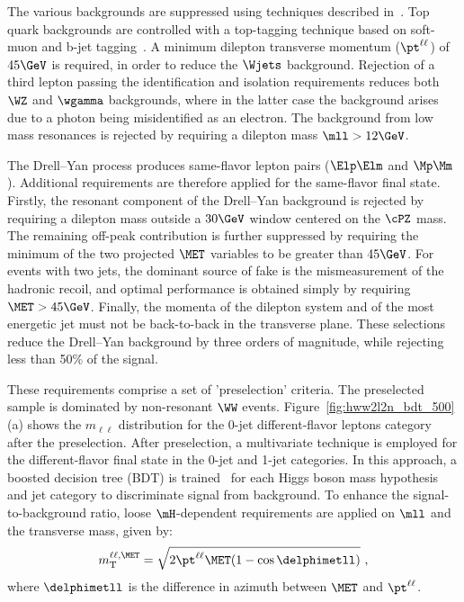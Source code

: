 The various backgrounds are suppressed using techniques described in~\cite{CMSobservation125}. Top quark backgrounds are controlled with a top-tagging technique based on soft-muon and b-jet tagging~\cite{CMS-PAS-BTV-11-003}. A minimum dilepton transverse momentum ($\pt^{\ell\ell}$) of $45\GeV$ is required, in order to reduce the $\Wjets$ background. Rejection of a third lepton passing the identification and isolation requirements reduces both $\WZ$ and $\wgamma$ backgrounds,
where in the latter case the background arises due to a photon being misidentified as an electron. The background from low mass resonances is rejected by requiring a dilepton mass $\mll>12\GeV$.

The Drell--Yan process produces same-flavor lepton pairs ($\Elp\Elm$ and $\Mp\Mm$). Additional requirements are 
therefore applied for the same-flavor final state. Firstly, the resonant component of the Drell--Yan background
is rejected by requiring a dilepton mass outside a $30\GeV$ window centered on the $\cPZ$ mass. The remaining
off-peak contribution is further suppressed by requiring the minimum of the two projected $\MET$ variables to
be greater than $45\GeV$. For events with two jets, the dominant source of fake \MET is the mismeasurement of
the hadronic recoil, and optimal performance is obtained simply by requiring $\MET>45\GeV$. Finally, the momenta of the dilepton system and of the most energetic jet must not be back-to-back in the transverse plane. These selections
reduce the Drell--Yan background by three orders of magnitude, while rejecting less than 50\% of the signal.

These requirements comprise a set of 'preselection' criteria. The preselected sample is dominated by non-resonant $\WW$ events. Figure~\ref{fig:hww2l2n_bdt_500}(a) shows the $m_{\ell\ell}$ distribution for the 0-jet different-flavor leptons category after the preselection. After preselection, a multivariate technique is employed for the different-flavor final state in the 0-jet
and 1-jet categories. In this approach, a boosted decision tree (BDT) is trained~\cite{tmva} for each Higgs boson mass hypothesis and jet category to discriminate signal from background. To enhance the signal-to-background ratio, loose $\mH$-dependent requirements are applied on $\mll$ and the transverse mass, given by:
\begin{equation} 
m_\mathrm{T}^{\ell\ell,\MET} = \sqrt{2 \pt^{\ell\ell} \MET (1-\cos\delphimetll)}\ ,
\nonumber
\end{equation}
where $\delphimetll$ is the difference in azimuth between $\MET$ and $\pt^{\ell\ell}$.


